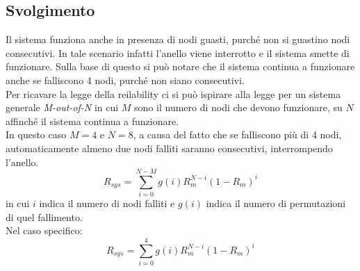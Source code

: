 \subsection{Svolgimento}
Il sistema funziona anche in presenza di nodi guasti, purché non si guastino nodi consecutivi. In tale scenario infatti l'anello viene interrotto e il sistema smette di funzionare. Sulla base di questo si può notare che il sistema continua a funzionare anche se falliscono 4 nodi, purché non siano consecutivi.
\\Per ricavare la legge della reilability ci si può ispirare alla legge per un sistema generale \textit{M-out-of-N} in cui $M$ sono il numero di nodi che devono funzionare, su $N$ affinché il sistema continua a funzionare.
\\In questo caso $M=4$ e $N=8$, a causa del fatto che se falliscono più di 4 nodi, automaticamente almeno due nodi falliti saranno consecutivi, interrompendo l'anello.
\begin{equation*}
	R_{sys} = \sum_{i=0}^{N-M}g(i)R_m^{N-i}(1-R_m)^i
\end{equation*}
in cui $i$ indica il numero di nodi falliti e $g(i)$ indica il numero di permutazioni di quel fallimento.
\\Nel caso specifico:
\begin{equation*}
	R_{sys} = \sum_{i=0}^{4}g(i)R_m^{N-i}(1-R_m)^i
\end{equation*}
